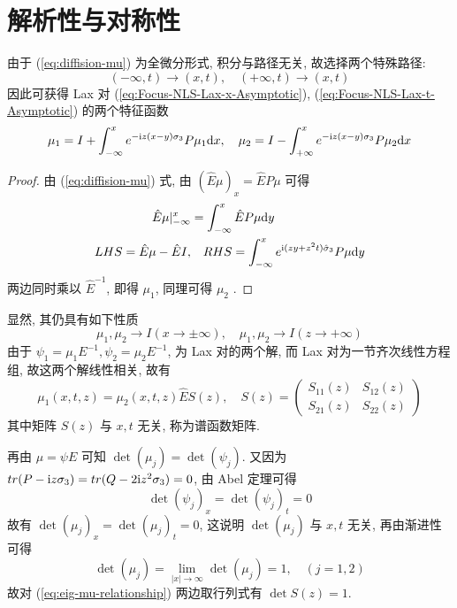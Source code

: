 \section{解析性与对称性}\label{sec:analytic-symmetry}
由于 (\ref{eq:diffision-mu}) 为全微分形式, 积分与路径无关, 故选择两个特殊路径: 
\begin{equation*}
  (- \infty, t) \to(x,t) , \quad (+ \infty, t) \to(x,t)
\end{equation*}
因此可获得 Lax 对 (\ref{eq:Focus-NLS-Lax-x-Asymptotic}), (\ref{eq:Focus-NLS-Lax-t-Asymptotic}) 的两个特征函数 
\begin{equation}
  \mu_{1} = I + \int^{x}_{-\infty} e^{- \mathrm{i} z (x - y) \sigma_{3}} P \mu_{1}\mathrm{d} x, \quad \mu_{2} = I - \int^{x}_{+\infty} e^{- \mathrm{i} z (x - y) \sigma_{3}} P \mu_{2}\mathrm{d} x \label{eq:integral-mu}
\end{equation}
\begin{proof}
  由 (\ref{eq:diffision-mu}) 式, 由 $ (\hat{E} \mu)_{x} = \hat{E} P \mu $ 可得
  \begin{subequations}
  \begin{align}
    \hat{E} \mu |_{-\infty}^{x} &= \int_{-\infty}^{x} \hat{E} P \mu \mathrm{d} y \\
    LHS = \hat{E} \mu - \hat{E} I , & \quad RHS = \int_{-\infty}^{x} e^{ \mathrm{i} (zy + z^2 t )\hat{\sigma}_{3}} P \mu \mathrm{d} y 
  \end{align}
  \end{subequations}
  两边同时乘以 $ \hat{E}^{-1} $, 即得 $ \mu_{1} $, 同理可得 $ \mu_{2} $ . 
\end{proof}

显然, 其仍具有如下性质
\begin{equation}
  \mu_{1}, \mu_{2} \to I (x \to \pm \infty), \quad  \mu_{1}, \mu_{2} \to I (z \to + \infty)
\end{equation}
由于 $ \psi_{1} = \mu_{1} E^{-1}, \psi_{2} = \mu_{2} E^{-1} $, 为 Lax 对的两个解, 而 Lax 对为一节齐次线性方程组, 故这两个解线性相关, 故有
\begin{equation}
  \mu_{1}(x,t,z) = \mu_{2}(x,t,z) \hat{E} S(z), \label{eq:eig-mu-relationship} \quad 
  S(z) = 
  \begin{pmatrix}
    S_{11}(z) & S_{12}(z) \\ S_{21}(z) & S_{22}(z)
  \end{pmatrix}
\end{equation}
其中矩阵 $ S(z) $ 与 $ x,t $ 无关, 称为谱函数矩阵. 

再由 $ \mu = \psi E $ 可知 $ \det(\mu_{j}) = \det(\psi_{j}) $. 又因为 $ tr(P - \mathrm{i} z \sigma_{3}) = tr(Q - 2 \mathrm{i} z^2 \sigma_{3}) = 0 $, 由 Abel 定理可得
\begin{equation}
  \det(\psi_{j})_{x} = \det(\psi_{j})_{t} = 0
\end{equation}
故有 $ \det(\mu_{j})_x = \det(\mu_{j})_{t} = 0 $, 这说明 $ \det(\mu_{j}) $ 与 $ x,t $ 无关, 再由渐进性可得
\begin{equation}
  \det(\mu_{j}) = \lim_{|x| \to \infty} \det(\mu_{j}) = 1, \quad(j = 1,2) \label{eq:mu-det}
\end{equation}
故对 (\ref{eq:eig-mu-relationship}) 两边取行列式有 $ \det S(z) = 1 $. 

